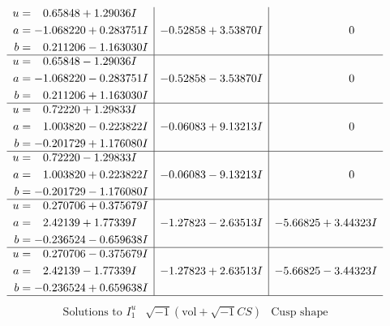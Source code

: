 \documentclass[1p]{elsarticle_modified}
\theoremstyle{definition}
\newcommand{\I}{\sqrt{-1}}
\begin{document}
$$\begin{array}{c|c|c}
\begin{aligned}
u &= \phantom{-}0.65848 + 1.29036 I \\
a &= -1.068220 + 0.283751 I \\
b &= \phantom{-}0.211206 - 1.163030 I\end{aligned}
 & -0.52858 + 3.53870 I & \phantom{-0.000000 } 0 \\ \hline\begin{aligned}
u &= \phantom{-}0.65848 - 1.29036 I \\
a &= -1.068220 - 0.283751 I \\
b &= \phantom{-}0.211206 + 1.163030 I\end{aligned}
 & -0.52858 - 3.53870 I & \phantom{-0.000000 } 0 \\ \hline\begin{aligned}
u &= \phantom{-}0.72220 + 1.29833 I \\
a &= \phantom{-}1.003820 - 0.223822 I \\
b &= -0.201729 + 1.176080 I\end{aligned}
 & -0.06083 + 9.13213 I & \phantom{-0.000000 } 0 \\ \hline\begin{aligned}
u &= \phantom{-}0.72220 - 1.29833 I \\
a &= \phantom{-}1.003820 + 0.223822 I \\
b &= -0.201729 - 1.176080 I\end{aligned}
 & -0.06083 - 9.13213 I & \phantom{-0.000000 } 0 \\ \hline\begin{aligned}
u &= \phantom{-}0.270706 + 0.375679 I \\
a &= \phantom{-}2.42139 + 1.77339 I \\
b &= -0.236524 - 0.659638 I\end{aligned}
 & -1.27823 - 2.63513 I & -5.66825 + 3.44323 I \\ \hline\begin{aligned}
u &= \phantom{-}0.270706 - 0.375679 I \\
a &= \phantom{-}2.42139 - 1.77339 I \\
b &= -0.236524 + 0.659638 I\end{aligned}
 & -1.27823 + 2.63513 I & -5.66825 - 3.44323 I\\
 \hline 
 \end{array}$$\newpage$$\begin{array}{c|c|c}  
\text{Solutions to }I^u_{1}& \I (\text{vol} + \sqrt{-1}CS) & \text{Cusp shape}\\
 \hline 
\begin{aligned}

\end{aligned}
\end{array}$$
\end{document}
